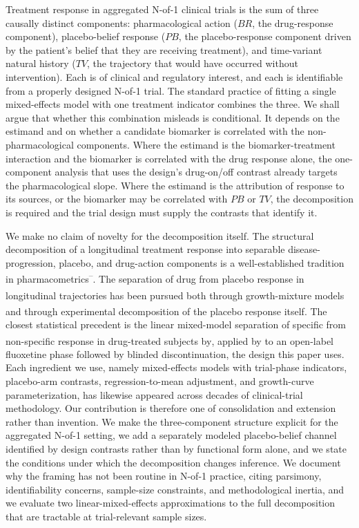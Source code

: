 \documentclass[
  11pt,
]{article}
\begin{document}
Treatment response in aggregated N-of-1 clinical trials is the sum of
three causally distinct components: pharmacological action (\(BR\), the
drug-response component), placebo-belief response (\(PB\), the
placebo-response component driven by the patient's belief that they are
receiving treatment), and time-variant natural history (\(TV\), the
trajectory that would have occurred without intervention). Each is of
clinical and regulatory interest, and each is identifiable from a
properly designed N-of-1 trial. The standard practice of fitting a
single mixed-effects model with one treatment indicator combines the
three. We shall argue that whether this combination misleads is
conditional. It depends on the estimand and on whether a candidate
biomarker is correlated with the non-pharmacological components. Where
the estimand is the biomarker-treatment interaction and the biomarker
is correlated with the drug response alone, the one-component analysis
that uses the design's drug-on/off contrast already targets the
pharmacological slope. Where the estimand is the attribution of
response to its sources, or the biomarker may be correlated with \(PB\)
or \(TV\), the decomposition is required and the trial design must
supply the contrasts that identify it.

We make no claim of novelty for the decomposition itself. The structural
decomposition of a longitudinal treatment response into separable
disease-progression, placebo, and drug-action components is a well-established
tradition in pharmacometrics\textsuperscript{--}. The
separation of drug from placebo response in longitudinal trajectories has been
pursued both through growth-mixture models\textsuperscript{} and through
experimental decomposition of the placebo response itself\textsuperscript{}. The closest statistical precedent is the linear
mixed-model separation of specific from non-specific response in
drug-treated subjects by\textsuperscript{}, applied by\textsuperscript{} to an
open-label fluoxetine phase followed by blinded discontinuation, the
design this paper uses. Each ingredient we use, namely mixed-effects models
with trial-phase indicators, placebo-arm contrasts, regression-to-mean
adjustment, and growth-curve parameterization, has likewise appeared across
decades of clinical-trial methodology. Our contribution is therefore one of
consolidation and extension rather than invention. We make the three-component
structure explicit for the aggregated N-of-1 setting, we add a separately
modeled placebo-belief channel identified by design contrasts rather than by
functional form alone, and we state the conditions under which the
decomposition changes inference. We document why the framing has not been
routine in N-of-1 practice, citing parsimony, identifiability concerns,
sample-size constraints, and methodological inertia, and we evaluate two
linear-mixed-effects approximations to the full decomposition that are
tractable at trial-relevant sample sizes.
\end{document}
